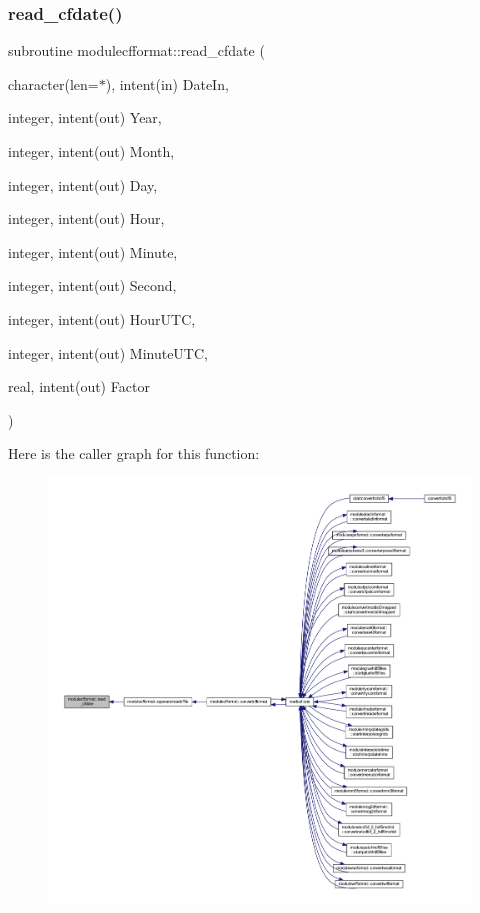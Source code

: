 \subsubsection{\texorpdfstring{read\+\_\+cfdate()}{read\_cfdate()}}
{\footnotesize\ttfamily subroutine modulecfformat\+::read\+\_\+cfdate (\begin{DoxyParamCaption}\item[{character(len=$\ast$), intent(in)}]{Date\+In,  }\item[{integer, intent(out)}]{Year,  }\item[{integer, intent(out)}]{Month,  }\item[{integer, intent(out)}]{Day,  }\item[{integer, intent(out)}]{Hour,  }\item[{integer, intent(out)}]{Minute,  }\item[{integer, intent(out)}]{Second,  }\item[{integer, intent(out)}]{Hour\+U\+TC,  }\item[{integer, intent(out)}]{Minute\+U\+TC,  }\item[{real, intent(out)}]{Factor }\end{DoxyParamCaption})\hspace{0.3cm}{\ttfamily [private]}}

Here is the caller graph for this function\+:\nopagebreak
\begin{figure}[H]
\begin{center}
\leavevmode
\includegraphics[width=350pt]{namespacemodulecfformat_a76cf49362d3cf1651d95e683370014a6_icgraph}
\end{center}
\end{figure}
\mbox{\label{namespacemodulecfformat_a127693205be384834843b9bb374985e3}} 
